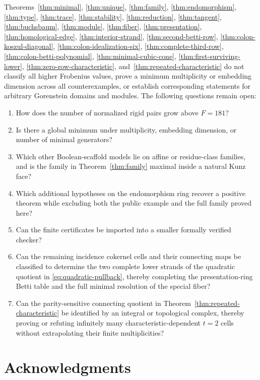 \documentclass[11pt]{article}
\theoremstyle{definition}
\theoremstyle{remark}
\begin{document}
Theorems~\ref{thm:minimal}, \ref{thm:unique}, \ref{thm:family}, \ref{thm:endomorphism},
\ref{thm:type}, \ref{thm:trace}, \ref{thm:stability}, \ref{thm:reduction},
\ref{thm:tangent}, \ref{thm:buchsbaum}, \ref{thm:module}, \ref{thm:fiber},
\ref{thm:presentation}, \ref{thm:homological-edge}, \ref{thm:interior-strand},
\ref{thm:second-betti-row}, \ref{thm:colon-koszul-diagonal},
\ref{thm:colon-idealization-six}, \ref{thm:complete-third-row},
\ref{thm:colon-betti-polynomial}, \ref{thm:minimal-cubic-cone},
\ref{thm:first-surviving-lower}, \ref{thm:zero-row-characteristic},
and~\ref{thm:repeated-characteristic}
do not classify all higher
Frobenius values, prove a minimum multiplicity or embedding dimension across all counterexamples,
or establish corresponding statements for arbitrary Gorenstein domains and modules. The following
questions remain open:
\begin{enumerate}
  \item How does the number of normalized rigid pairs grow above $F=181$?
  \item Is there a global minimum under multiplicity, embedding dimension, or number of minimal
  generators?
  \item Which other Boolean-scaffold models lie on affine or residue-class families, and is the
  family in Theorem~\ref{thm:family} maximal inside a natural Kunz face?
  \item Which additional hypotheses on the endomorphism ring recover a positive theorem while
  excluding both the public example and the full family proved here?
  \item Can the finite certificates be imported into a smaller formally verified checker?
  \item Can the remaining incidence cokernel cells and their connecting maps be classified to
  determine the two complete lower strands of the quadratic quotient in
  \eqref{eq:quadratic-pullback}, thereby completing the presentation-ring Betti table and the full
  minimal resolution of the special fiber?
  \item Can the parity-sensitive connecting quotient in
  Theorem~\ref{thm:repeated-characteristic} be identified by an integral or topological complex,
  thereby proving or refuting infinitely many characteristic-dependent $t=2$ cells without
  extrapolating their finite multiplicities?
\end{enumerate}

\section*{Acknowledgments}
\end{document}
